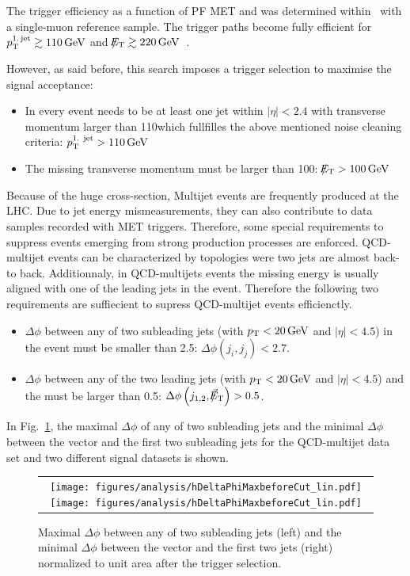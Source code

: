 The trigger efficiency as a function of PF MET and \ptfirstjet was determined within~\cite{bib:CMS:DM_8TeV} with a single-muon reference sample.
The trigger paths become fully efficient for $p_{\text{T}}^{\text{1.\,jet}} \gtrsim 110\,\text{Ge}\kern-0.06667em\text{V}$ and $\slash\mkern-12mu{E}_{\text{T}} \gtrsim 220\,\text{Ge}\kern-0.06667em\text{V}$~\cite{bib:CMS:DM_8TeV_AN}.

However, as said before, this search imposes a trigger selection to maximise the signal acceptance:
\begin{itemize}
\renewcommand{\labelitemi}{\footnotesize{\ding{118}}}
\item In every event needs to be at least one jet within $|\eta|<2.4$ with transverse momentum larger than 110\gev which fullfilles the above mentioned noise cleaning criteria: \mbox{$p_{\text{T}}^{\text{1. jet}}>110\,\text{Ge}\kern-0.06667em\text{V}$}
\item The missing transverse momentum must be larger than 100\gev: \mbox{$\slash\mkern-12mu{E}_{\text{T}}>100\,\text{Ge}\kern-0.06667em\text{V}$}
\end{itemize}

\hspace{0.9cm}

Because of the huge cross-section, Multijet events are frequently produced at the LHC.
Due to jet energy mismeasurements, they can also contribute to data samples recorded with MET triggers.
Therefore, some special requirements to suppress events emerging from strong production processes are enforced.
QCD-multijet events can be characterized by topologies were two jets are almost back-to back.
Additionnaly, in QCD-multijets events the missing energy is usually aligned with one of the leading jets in the event.
Therefore the following two requirements are suffiecient to supress QCD-multijet events efficienctly.
\begin{itemize}
\renewcommand{\labelitemi}{\footnotesize{\ding{118}}}
\item $\Delta\phi$ between any of two subleading jets (with $p_{\text{T}}<20\,\text{Ge}\kern-0.06667em\text{V}$ and $|\eta|<4.5$) in the event must be smaller than 2.5: \mbox{$\Delta\phi\left( j_i, j_j\right)<2.7$}.
\item $\Delta\phi$ between any of the two leading jets (with $p_{\text{T}}<20\,\text{Ge}\kern-0.06667em\text{V}$ and $|\eta|<4.5$) and the \met must be larger than 0.5: \mbox{$\Delta\phi\left( j_{1,2}, \slash\mkern-12mu{\vec{E}}_{\text{T}} \right) > 0.5$.} 
\end{itemize}
In Fig.~\ref{fig:QCDcuts}, the maximal $\Delta \phi$ of any of two subleading jets  and the minimal $\Delta \phi$ between the \met vector and the first two subleading jets for the QCD-multijet data set and two different signal datasets is shown.\\
\begin{figure}[!t]
  \centering 
  \begin{tabular}{c}
    \texttt{[image: figures/analysis/hDeltaPhiMaxbeforeCut\_lin.pdf]}
    \texttt{[image: figures/analysis/hDeltaPhiMaxbeforeCut\_lin.pdf]}
  \end{tabular}
  \caption{Maximal $\Delta \phi$ between any of two subleading jets (left) and the minimal $\Delta \phi$  between the \met vector and the first two jets (right) normalized to unit area after the trigger selection.}
  \label{fig:QCDcuts}
\end{figure}
\hspace{0.9cm}

